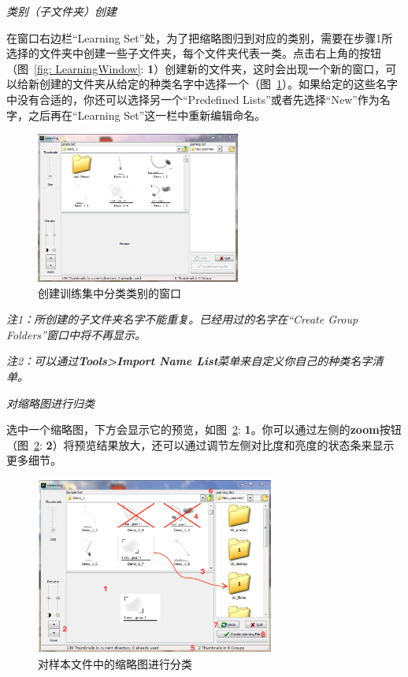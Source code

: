 \documentclass[12pt]{article}
\begin{document}
\textit{类别（子文件夹）创建}

在窗口右边栏“Learning Set”处，为了把缩略图归到对应的类别，需要在步骤1所选择的文件夹中创建一些子文件夹，每个文件夹代表一类。点击右上角的按钮（图~\ref{fig: LearningWindow}: {\color{red}\textbf{1}}）创建新的文件夹，这时会出现一个新的窗口，可以给新创建的文件夹从给定的种类名字中选择一个（图~\ref{fig: CreateGroupsWindow}）。如果给定的这些名字中没有合适的，你还可以选择另一个“Predefined Lists”或者先选择“New”作为名字，之后再在“Learning Set”这一栏中重新编辑命名。

\begin{figure}[!ht]
\centering
\includegraphics[width=0.6\textwidth]{LearningWindow.png}
\caption{创建训练集中分类类别的窗口}
\label{fig: CreateGroupsWindow}
\end{figure} 

{\color{blue}\textit{注1：所创建的子文件夹名字不能重复。已经用过的名字在“Create Group Folders”窗口中将不再显示。}}

{\color{blue}\textit{注2：可以通过\textbf{Tools>Import Name List}菜单来自定义你自己的种类名字清单。}}

\textit{对缩略图进行归类}

选中一个缩略图，下方会显示它的预览，如图~\ref{fig: ThumbnailsSorting}: {\color{red}\textbf{1}}。你可以通过左侧的\textbf{zoom}按钮（图~\ref{fig: ThumbnailsSorting}: {\color{red}\textbf{2}}）将预览结果放大，还可以通过调节左侧对比度和亮度的状态条来显示更多细节。

\begin{figure}[!ht]
\centering
\includegraphics[width=0.7\textwidth]{ThumbnailsSorting.eps}
\caption{对样本文件中的缩略图进行分类}
\label{fig: ThumbnailsSorting}
\end{figure} 
\end{document}
